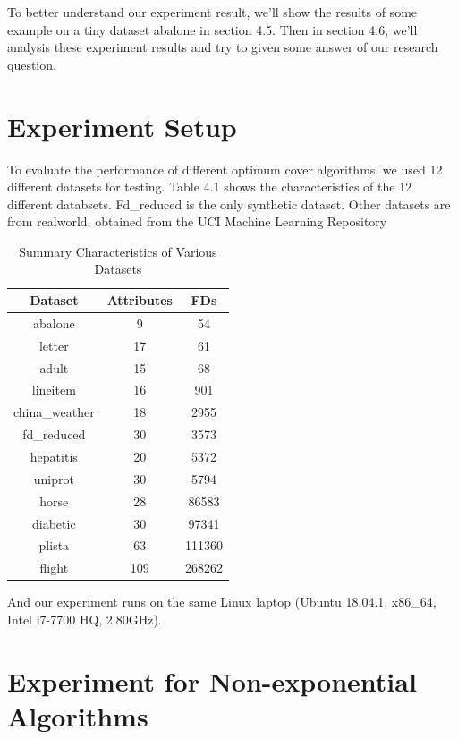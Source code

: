 \documentclass[11pt]{book}
\begin{document}
To better understand our experiment result, we'll show the results of some example on a tiny dataset abalone in section 4.5. Then in section 4.6, we'll analysis these experiment results and try to given some answer of our research question.

\section{Experiment Setup}

To evaluate the performance of different optimum cover algorithms, we used 12 different datasets for testing. Table 4.1 shows the characteristics of the 12 different databsets. Fd\_reduced is the only synthetic dataset. Other datasets are from realworld, obtained from the UCI Machine Learning Repository \cite{asuncion2007uci}

\begin{table}

	\centering
	
	\begin{tabular}{ |c|c|c| }
		\hline
		Dataset & Attributes & FDs \\
		\hline
		abalone        & 9 & 54 \\
		letter         & 17 & 61 \\
		adult          & 15 & 68 \\
		lineitem       & 16 & 901  \\ 
		china\_weather & 18 & 2955 \\ 
		fd\_reduced    & 30 & 3573 \\
		hepatitis      & 20 & 5372 \\
		uniprot        & 30 & 5794 \\
		horse          & 28 & 86583 \\
		diabetic       & 30 & 97341 \\
		plista         & 63 & 111360 \\
		flight         & 109 & 268262 \\
		\hline
	\end{tabular}

	\caption{Summary Characteristics of Various Datasets}
	
\end{table}

And our experiment runs on the same Linux laptop (Ubuntu 18.04.1, x86\_64, Intel i7-7700 HQ, 2.80GHz). 

\section{Experiment for Non-exponential Algorithms}
\end{document}
